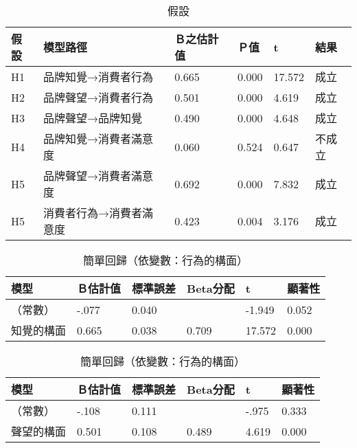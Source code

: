 \begin{table}[htb]
\caption{假設}
\label{tab:p7}
\renewcommand{\arraystretch}{1.2} %
\arrayrulewidth=1pt               %
\tabcolsep=10pt                   %
\begin{tabular}[t]{llllll}  %
\hline
 假設&模型路徑&Ｂ之估計值& Ｐ值& t& 結果 \\
\hline
H1&品牌知覺→消費者行為&0.665&0.000&17.572&成立\\
H2&品牌聲望→消費者行為&0.501&0.000&4.619&成立\\
H3&品牌聲望→品牌知覺&0.490&0.000&4.648&成立\\
H4&品牌知覺→消費者滿意度&0.060&0.524&0.647&不成立\\
H5&品牌聲望→消費者滿意度&0.692&0.000&7.832&成立\\
H5&消費者行為→消費者滿意度&0.423&0.004&3.176&成立\\
\hline
\end{tabular}
\end{table}

\begin{table}[htb]
\caption{簡單回歸（依變數：行為的構面）}
\label{tab:r01}
\renewcommand{\arraystretch}{1.2} %
\arrayrulewidth=1pt               %
\tabcolsep=10pt                   %
\begin{tabular}[t]{llllll}  %
\hline
 模型&Ｂ估計值&標準誤差&Beta分配&t&顯著性\\
\hline
（常數）&-.077&0.040& &-1.949&0.052\\
知覺的構面&0.665&0.038&0.709&17.572&0.000\\
\hline
\end{tabular}
\end{table}

\begin{table}[htb]
\caption{簡單回歸（依變數：行為的構面）}
\label{tab:r02}
\renewcommand{\arraystretch}{1.2} %
\arrayrulewidth=1pt               %
\tabcolsep=10pt                   %
\begin{tabular}[t]{llllll}  %
\hline
 模型&Ｂ估計值&標準誤差&Beta分配&t&顯著性\\
\hline
（常數）&-.108&0.111& &-.975&0.333\\
聲望的構面&0.501&0.108&0.489&4.619&0.000\\
\hline
\end{tabular}
\end{table}

